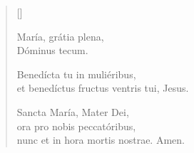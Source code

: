 \newHymn
{}

\begin{verse}[\versewidth]

 María, grátia plena,\\
Dóminus tecum.

Benedícta tu in muliéribus,\\
et benedíctus fructus ventris tui, Jesus.

Sancta María, Mater Dei,\\
ora pro nobis peccatóribus,\\
nunc et in hora mortis nostrae.  Amen.

\end{verse}


